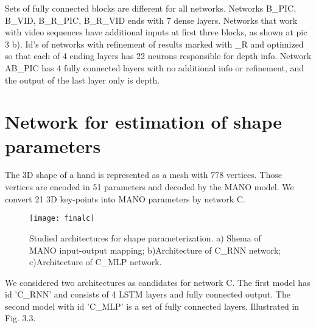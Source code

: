 Sets of fully connected blocks are different for all networks. Networks B\_PIC, B\_VID, B\_R\_PIC, B\_R\_VID ends with 7 dense layers. Networks that work with video sequences have additional inputs at first three blocks, as shown at pic 3 b). Id's of networks with refinement of results marked with \_R and optimized so that each of 4 ending layers has 22 neurons responsible for depth info. Network AB\_PIC has 4 fully connected layers with no additional info or refinement, and the output of the last layer only is depth.

\section{Network for estimation of shape parameters}

The 3D shape of a hand is represented as a mesh with 778 vertices. Those vertices are encoded in 51 parameters and decoded by the MANO model. We convert 21 3D key-points into MANO parameters by network C.
    
\begin{figure}[h]
\caption{Studied architectures for shape parameterization. a) Shema of MANO input-output mapping; b)Architecture of C\_RNN network; c)Architecture of C\_MLP network.}
\centering
\texttt{[image: finalc]}
\end{figure}


We considered two architectures as candidates for network C. The first model has id 'C\_RNN' and consists of 4 LSTM layers and fully connected output. The second model with id 'C\_MLP' is a set of fully connected layers. Illustrated in Fig. 3.3.
 



